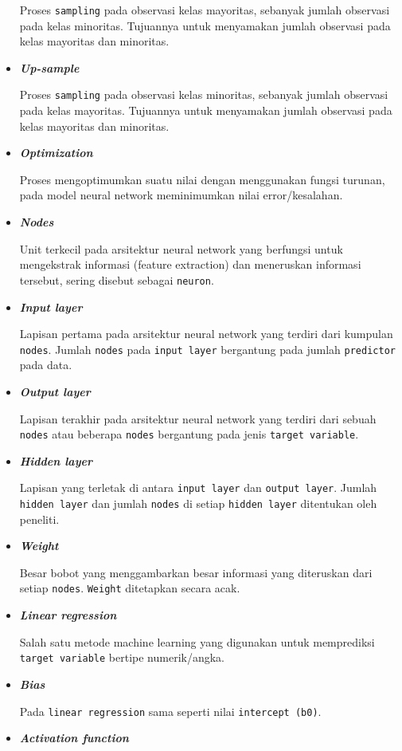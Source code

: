 \documentclass[
]{article}
\begin{document}
\begin{itemize}
  Proses \texttt{sampling} pada observasi kelas mayoritas, sebanyak
  jumlah observasi pada kelas minoritas. Tujuannya untuk menyamakan
  jumlah observasi pada kelas mayoritas dan minoritas.
\item
  \textbf{\emph{Up-sample}}

  Proses \texttt{sampling} pada observasi kelas minoritas, sebanyak
  jumlah observasi pada kelas mayoritas. Tujuannya untuk menyamakan
  jumlah observasi pada kelas mayoritas dan minoritas.
\item
  \textbf{\emph{Optimization}}

  Proses mengoptimumkan suatu nilai dengan menggunakan fungsi turunan,
  pada model neural network meminimumkan nilai error/kesalahan.
\item
  \textbf{\emph{Nodes}}

  Unit terkecil pada arsitektur neural network yang berfungsi untuk
  mengekstrak informasi (feature extraction) dan meneruskan informasi
  tersebut, sering disebut sebagai \texttt{neuron}.
\item
  \textbf{\emph{Input layer}}

  Lapisan pertama pada arsitektur neural network yang terdiri dari
  kumpulan \texttt{nodes}. Jumlah \texttt{nodes} pada
  \texttt{input\ layer} bergantung pada jumlah \texttt{predictor} pada
  data.
\item
  \textbf{\emph{Output layer}}

  Lapisan terakhir pada arsitektur neural network yang terdiri dari
  sebuah \texttt{nodes} atau beberapa \texttt{nodes} bergantung pada
  jenis \texttt{target\ variable}.
\item
  \textbf{\emph{Hidden layer}}

  Lapisan yang terletak di antara \texttt{input\ layer} dan
  \texttt{output\ layer}. Jumlah \texttt{hidden\ layer} dan jumlah
  \texttt{nodes} di setiap \texttt{hidden\ layer} ditentukan oleh
  peneliti.
\item
  \textbf{\emph{Weight}}

  Besar bobot yang menggambarkan besar informasi yang diteruskan dari
  setiap \texttt{nodes}. \texttt{Weight} ditetapkan secara acak.
\item
  \textbf{\emph{Linear regression}}

  Salah satu metode machine learning yang digunakan untuk memprediksi
  \texttt{target\ variable} bertipe numerik/angka.
\item
  \textbf{\emph{Bias}}

  Pada \texttt{linear\ regression} sama seperti nilai
  \texttt{intercept\ (b0)}.
\item
  \textbf{\emph{Activation function}}


\end{itemize}
\end{document}
